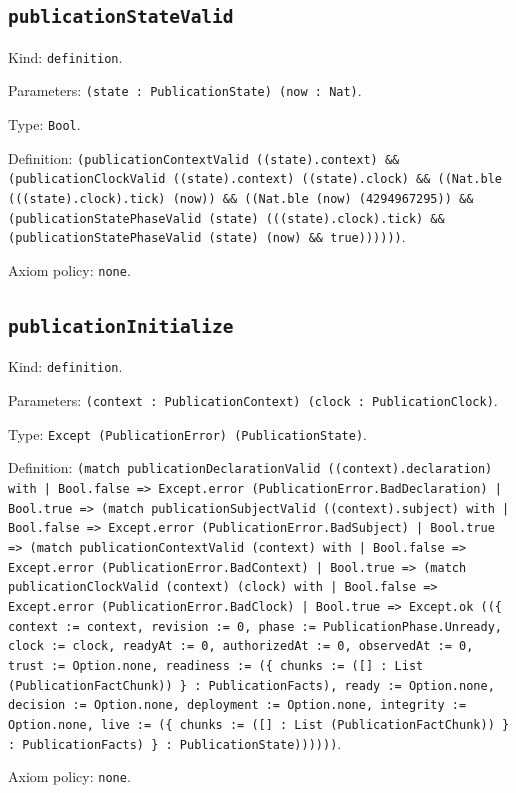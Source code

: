 \documentclass[11pt]{article}
\begin{document}
\subsection*{\texttt{publicationStateValid}}
\noindent Kind: \texttt{definition}.\par
\noindent Parameters: \texttt{(state : PublicationState) (now : Nat)}.\par
\noindent Type: \texttt{Bool}.\par
\noindent Definition: \texttt{(publicationContextValid ((state).context) \&\& (publicationClockValid ((state).context) ((state).clock) \&\& ((Nat.ble (((state).clock).tick) (now)) \&\& ((Nat.ble (now) (4294967295)) \&\& (publicationStatePhaseValid (state) (((state).clock).tick) \&\& (publicationStatePhaseValid (state) (now) \&\& true))))))}.\par
\noindent Axiom policy: \texttt{none}.\par
\subsection*{\texttt{publicationInitialize}}
\noindent Kind: \texttt{definition}.\par
\noindent Parameters: \texttt{(context : PublicationContext) (clock : PublicationClock)}.\par
\noindent Type: \texttt{Except (PublicationError) (PublicationState)}.\par
\noindent Definition: \texttt{(match publicationDeclarationValid ((context).declaration) with | Bool.false => Except.error (PublicationError.BadDeclaration) | Bool.true => (match publicationSubjectValid ((context).subject) with | Bool.false => Except.error (PublicationError.BadSubject) | Bool.true => (match publicationContextValid (context) with | Bool.false => Except.error (PublicationError.BadContext) | Bool.true => (match publicationClockValid (context) (clock) with | Bool.false => Except.error (PublicationError.BadClock) | Bool.true => Except.ok ((\{ context := context, revision := 0, phase := PublicationPhase.Unready, clock := clock, readyAt := 0, authorizedAt := 0, observedAt := 0, trust := Option.none, readiness := (\{ chunks := ([] : List (PublicationFactChunk)) \} : PublicationFacts), ready := Option.none, decision := Option.none, deployment := Option.none, integrity := Option.none, live := (\{ chunks := ([] : List (PublicationFactChunk)) \} : PublicationFacts) \} : PublicationState))))))}.\par
\noindent Axiom policy: \texttt{none}.\par
\end{document}
